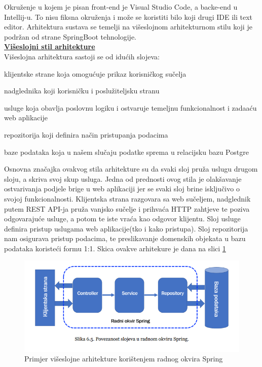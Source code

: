 	Okruženje u kojem je pisan front-end je Visual Studio Code, a backe-end u Intellij-u. To nisu fiksna okruženja i može se koristiti bilo koji drugi IDE ili text editor. Arhitektura sustava se temelji na višeslojnom arhitekturnom stilu koji je podržan od strane SpringBoot tehnologije.\\
	
	\textbf{\underline{Višeslojni stil arhitekture}}\\
	Višeslojna arhitektura sastoji se od idućih slojeva:
	\begin{packed_item}
	\setlength\itemindent{24pt}
	\item klijentske strane koja omogućuje prikaz korisničkog sučelja
	\item nadglednika koji korisničku i poslužiteljsku stranu
	\item usluge koja obavlja poslovnu logiku i ostvaruje temeljnu funkcionalnost i zadaaću web aplikacije
	 \item repozitorija koji definira način pristupanja podacima
	 \item baze podataka koja u našem slučaju podatke sprema u relacijsku bazu Postgre\\
	\end{packed_item}
	
	Osnovna značajka ovakvog stila arhitekture su da svaki sloj pruža uslugu drugom sloju, a skriva svoj skup usluga. Jedna od prednosti ovog stila je olakšavanje ostvarivanja podjele brige u web aplikaciji jer se svaki sloj brine isključivo o svojoj funkcionalnosti. Klijentska strana razgovara sa web sučeljem, nadglednik putem REST API-ja pruža vanjsko sučelje i prihvaća HTTP zahtjeve te poziva odgovarajuće usluge, a potom te iste vraća kao odgovor klijentu. Sloj usluge definira pristup uslugama web aplikacije(tko i kako pristupa). Sloj repozitorija nam osigurava pristup podacima, te preslikavanje domenskih objekata u bazu podataka koristeći formu 1:1. Skica ovakve arhitekure je dana na slici \ref{fig:arhitektura}\\
	
	\begin{figure}[H]
			\includegraphics[scale=0.8]{slike/viseslojna_arhitekt.PNG} %
			\centering
			\caption{Primjer višeslojne arhitekture korištenjem radnog okvira Spring}
			\label{fig:arhitektura}
		\end{figure}

